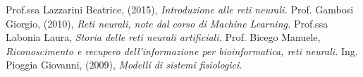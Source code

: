 \documentclass[12pt,a4paper,oneside]{book}
\begin{document}
\clearpage 
\begin{thebibliography}{9} 
	 Prof.ssa Lazzarini Beatrice, (2015), \emph{Introduzione alle reti neurali.}
	 Prof. Gambosi Giorgio, (2010), \emph{Reti neurali, note dal corso di Machine Learning.}
	 Prof.ssa Labonia Laura, \emph{Storia delle reti neurali artificiali.}
	 Prof. Bicego Manuele, \emph{Riconoscimento e recupero dell’informazione per bioinformatica, reti neurali.}
	 Ing. Pioggia Giovanni, (2009), \emph{Modelli di sistemi fisiologici.}
 \end{thebibliography}
	
\end{document}
